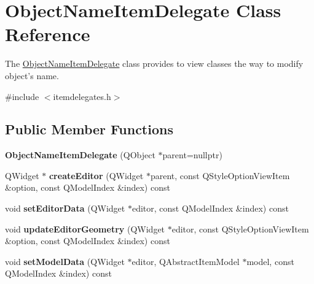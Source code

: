 \hypertarget{class_object_name_item_delegate}{\section{\-Object\-Name\-Item\-Delegate \-Class \-Reference}
\label{class_object_name_item_delegate}
}


\-The \hyperlink{class_object_name_item_delegate}{\-Object\-Name\-Item\-Delegate} class provides to view classes the way to modify object's name.  




{\ttfamily \#include $<$itemdelegates.\-h$>$}

\subsection*{\-Public \-Member \-Functions}
\begin{DoxyCompactItemize}
\item 
\hypertarget{class_object_name_item_delegate_a29ea6448c3b0db37a948cfb7802ce6b5}{{\bfseries \-Object\-Name\-Item\-Delegate} (\-Q\-Object $\ast$parent=nullptr)}\label{class_object_name_item_delegate_a29ea6448c3b0db37a948cfb7802ce6b5}

\item 
\hypertarget{class_object_name_item_delegate_a3e4e9d436c524a21953e61e0fcb9b798}{\-Q\-Widget $\ast$ {\bfseries create\-Editor} (\-Q\-Widget $\ast$parent, const \-Q\-Style\-Option\-View\-Item \&option, const \-Q\-Model\-Index \&index) const }\label{class_object_name_item_delegate_a3e4e9d436c524a21953e61e0fcb9b798}

\item 
\hypertarget{class_object_name_item_delegate_a97d0e306dd9de35e4db9074144b754e1}{void {\bfseries set\-Editor\-Data} (\-Q\-Widget $\ast$editor, const \-Q\-Model\-Index \&index) const }\label{class_object_name_item_delegate_a97d0e306dd9de35e4db9074144b754e1}

\item 
\hypertarget{class_object_name_item_delegate_a19c1f716cc9ae25eb428e2a8a976f6da}{void {\bfseries update\-Editor\-Geometry} (\-Q\-Widget $\ast$editor, const \-Q\-Style\-Option\-View\-Item \&option, const \-Q\-Model\-Index \&index) const }\label{class_object_name_item_delegate_a19c1f716cc9ae25eb428e2a8a976f6da}

\item 
\hypertarget{class_object_name_item_delegate_ad76b23ca6c74ba9888f1bf0fcc5129be}{void {\bfseries set\-Model\-Data} (\-Q\-Widget $\ast$editor, \-Q\-Abstract\-Item\-Model $\ast$model, const \-Q\-Model\-Index \&index) const }\label{class_object_name_item_delegate_ad76b23ca6c74ba9888f1bf0fcc5129be}

\end{DoxyCompactItemize}


